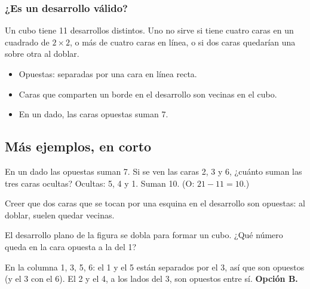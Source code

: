 
\subsubsection{¿Es un desarrollo válido?}
Un cubo tiene 11 desarrollos distintos. Uno no sirve si tiene cuatro caras en un cuadrado de $2 \times 2$, o más de
cuatro caras en línea, o si dos caras quedarían una sobre otra al doblar.

\begin{regla}
\begin{itemize}
  \item Opuestas: separadas por una cara en línea recta.
  \item Caras que comparten un borde en el desarrollo son vecinas en el cubo.
  \item En un dado, las caras opuestas suman 7.
\end{itemize}
\end{regla}

\subsection{Más ejemplos, en corto}
\begin{ejemplo}[Dado]
En un dado las opuestas suman 7. Si se ven las caras 2, 3 y 6, ¿cuánto suman las tres caras ocultas?
\solucion Ocultas: 5, 4 y 1. Suman 10. (O: $21 - 11 = 10$.)
\end{ejemplo}

\begin{trampa}
Creer que dos caras que se tocan por una esquina en el desarrollo son opuestas: al doblar, suelen quedar vecinas.
\end{trampa}

\begin{reto}
El desarrollo plano de la figura se dobla para formar un cubo. ¿Qué número queda en la cara opuesta a la del 1?
\begin{center}\end{center}
\end{reto}

\begin{retoresuelto}
En la columna 1, 3, 5, 6: el 1 y el 5 están separados por el 3, así que son opuestos (y el 3 con el 6). El 2 y el 4,
a los lados del 3, son opuestos entre sí. \textbf{Opción B.}
\end{retoresuelto}

